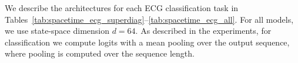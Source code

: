 


We describe the architectures for each ECG classification task in Tables~\ref{tab:spacetime_ecg_superdiag}--\ref{tab:spacetime_ecg_all}. For all models, we use state-space dimension $d = 64$. As described in the experiments, for classification we compute logits with a mean pooling over the output sequence, where pooling is computed over the sequence length. 

